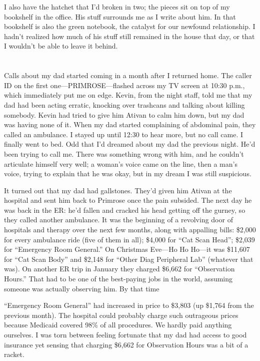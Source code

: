 \documentclass[12pt]{book}
\begin{document}
I also have the hatchet that I'd broken in two; the pieces sit on top of my bookshelf in the office. His stuff surrounds me as I write about him. In that bookshelf is also the green notebook, the catalyst for our newfound relationship. I hadn't realized how much of his stuff still remained in the house that day, or that I wouldn't be able to leave it behind. 

\part{}
\chapter{}

Calls about my dad started coming in a month after I returned home. The caller ID on the first one---PRIMROSE---flashed across my TV screen at 10:30 p.m., which immediately put me on edge. Kevin, from the night staff, told me that my dad had been acting erratic, knocking over trashcans and talking about killing somebody. Kevin had tried to give him Ativan to calm him down, but my dad was having none of it. When my dad started complaining of abdominal pain, they called an ambulance. I stayed up until 12:30 to hear more, but no call came. I finally went to bed. Odd that I'd dreamed about my dad the previous night. He'd been trying to call me. There was something wrong with him, and he couldn't articulate himself very well; a woman's voice came on the line, then a man's voice, trying to explain that he was okay, but in my dream I was still suspicious.

It turned out that my dad had gallstones. They'd given him Ativan at the hospital and sent him back to Primrose once the pain subsided. The next day he was back in the ER: he'd fallen and cracked his head getting off the gurney, so they called another ambulance. It was the beginning of a revolving door of hospitals and therapy over the next few months, along with appalling bills: \$2,000 for every ambulance ride (five of them in all); \$4,000 for ``Cat Scan Head''; \$2,039 for ``Emergency Room General.'' On Christmas Eve---Ho Ho Ho---it was \$11,607 for ``Cat Scan Body'' and \$2,148 for ``Other Diag Peripheral Lab'' (whatever that was). On another ER trip in January they charged \$6,662 for ``Observation Hours.'' That had to be one of the best-paying jobs in the world, assuming someone was actually observing him. By that time

``Emergency Room General'' had increased in price to \$3,803 (up \$1,764 from the previous month). The hospital could probably charge such outrageous prices because Medicaid covered 98\% of all procedures. We hardly paid anything ourselves. I was torn between feeling fortunate that my dad had access to good insurance yet sensing that charging \$6,662 for Observation Hours was a bit of a racket.
\end{document}
